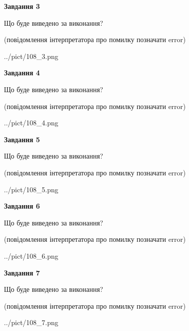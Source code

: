 \documentclass[12pt, ukrainian]{article}
\begin{document}
{\begin {large}
{\begin {center}\textbf{Завдання 3}\end {center}}\par
Що буде виведено за виконання?\par
 (повідомлення інтерпретатора про помилку позначати error)\par
\begin{center}
	{../pict/108_3.png}
\end{center}
\newpage

{\begin {center}\textbf{Завдання 4}\end {center}}\par
Що буде виведено за виконання?\par
 (повідомлення інтерпретатора про помилку позначати error)\par
\begin{center}
	{../pict/108_4.png}
\end{center}
\newpage

{\begin {center}\textbf{Завдання 5}\end {center}}\par
Що буде виведено за виконання?\par
 (повідомлення інтерпретатора про помилку позначати error)\par
\begin{center}
	{../pict/108_5.png}
\end{center}
\newpage

{\begin {center}\textbf{Завдання 6}\end {center}}\par
Що буде виведено за виконання?\par
 (повідомлення інтерпретатора про помилку позначати error)\par
\begin{center}
	{../pict/108_6.png}
\end{center}
\newpage

{\begin {center}\textbf{Завдання 7}\end {center}}\par
Що буде виведено за виконання?\par
 (повідомлення інтерпретатора про помилку позначати error)\par
\begin{center}
	{../pict/108_7.png}
\end{center}
\newpage


\end{large}}
\end{document}
